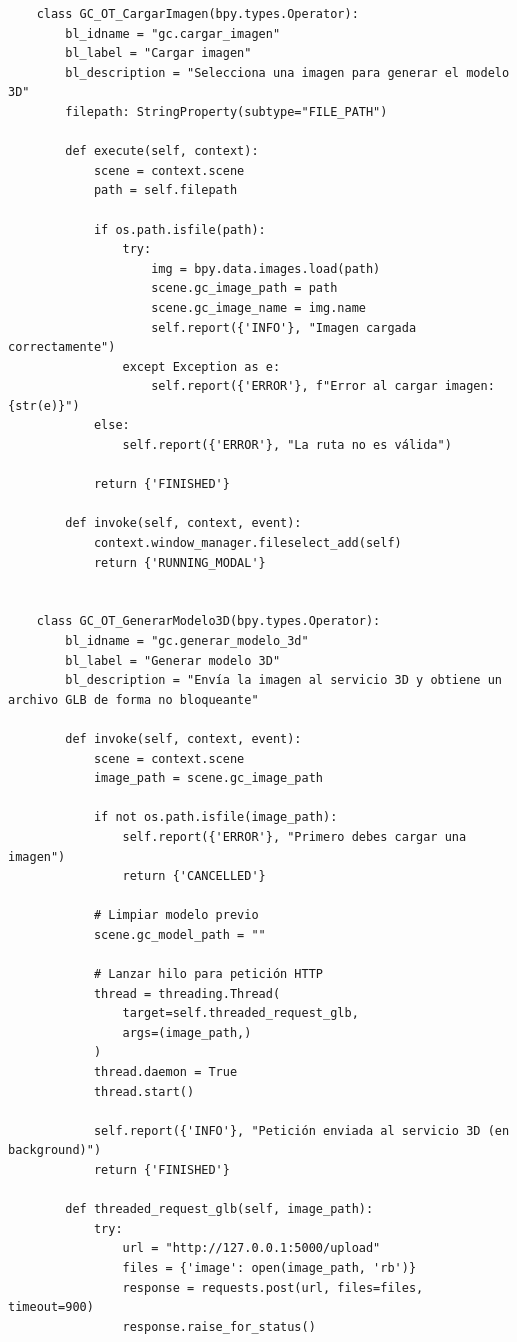 \begin{verbatim}
    class GC_OT_CargarImagen(bpy.types.Operator):
        bl_idname = "gc.cargar_imagen"
        bl_label = "Cargar imagen"
        bl_description = "Selecciona una imagen para generar el modelo 3D"
        filepath: StringProperty(subtype="FILE_PATH")
    
        def execute(self, context):
            scene = context.scene
            path = self.filepath
    
            if os.path.isfile(path):
                try:
                    img = bpy.data.images.load(path)
                    scene.gc_image_path = path
                    scene.gc_image_name = img.name
                    self.report({'INFO'}, "Imagen cargada correctamente")
                except Exception as e:
                    self.report({'ERROR'}, f"Error al cargar imagen: {str(e)}")
            else:
                self.report({'ERROR'}, "La ruta no es válida")
    
            return {'FINISHED'}
    
        def invoke(self, context, event):
            context.window_manager.fileselect_add(self)
            return {'RUNNING_MODAL'}
    
    
    class GC_OT_GenerarModelo3D(bpy.types.Operator):
        bl_idname = "gc.generar_modelo_3d"
        bl_label = "Generar modelo 3D"
        bl_description = "Envía la imagen al servicio 3D y obtiene un archivo GLB de forma no bloqueante"
    
        def invoke(self, context, event):
            scene = context.scene
            image_path = scene.gc_image_path
    
            if not os.path.isfile(image_path):
                self.report({'ERROR'}, "Primero debes cargar una imagen")
                return {'CANCELLED'}
    
            # Limpiar modelo previo
            scene.gc_model_path = ""
    
            # Lanzar hilo para petición HTTP
            thread = threading.Thread(
                target=self.threaded_request_glb,
                args=(image_path,)
            )
            thread.daemon = True
            thread.start()
    
            self.report({'INFO'}, "Petición enviada al servicio 3D (en background)")
            return {'FINISHED'}
    
        def threaded_request_glb(self, image_path):
            try:
                url = "http://127.0.0.1:5000/upload"
                files = {'image': open(image_path, 'rb')}
                response = requests.post(url, files=files, timeout=900)
                response.raise_for_status()
    

\end{verbatim}
